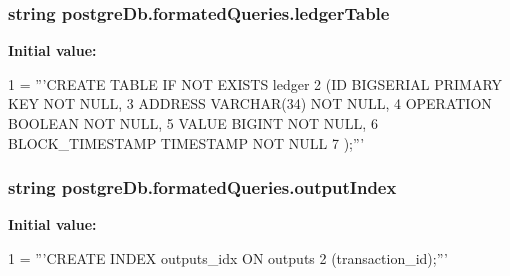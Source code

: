 \subsubsection[{ledger\+Table}]{\setlength{\rightskip}{0pt plus 5cm}string postgre\+Db.\+formated\+Queries.\+ledger\+Table}\label{namespacepostgreDb_1_1formatedQueries_a09445394a01258a235aa4db0ea66ea58}
{\bfseries Initial value\+:}
\begin{DoxyCode}
1 = \textcolor{stringliteral}{'''CREATE TABLE IF NOT EXISTS ledger}
2 \textcolor{stringliteral}{                (ID                 BIGSERIAL PRIMARY KEY   NOT NULL,}
3 \textcolor{stringliteral}{                ADDRESS             VARCHAR(34)         NOT NULL,}
4 \textcolor{stringliteral}{                OPERATION           BOOLEAN             NOT NULL,}
5 \textcolor{stringliteral}{                VALUE               BIGINT              NOT NULL,}
6 \textcolor{stringliteral}{                BLOCK\_TIMESTAMP     TIMESTAMP           NOT NULL}
7 \textcolor{stringliteral}{                );'''}
\end{DoxyCode}
\hypertarget{namespacepostgreDb_1_1formatedQueries_a099e801ee8670a18fece858b869e2292}{}
\subsubsection[{output\+Index}]{\setlength{\rightskip}{0pt plus 5cm}string postgre\+Db.\+formated\+Queries.\+output\+Index}\label{namespacepostgreDb_1_1formatedQueries_a099e801ee8670a18fece858b869e2292}
{\bfseries Initial value\+:}
\begin{DoxyCode}
1 = \textcolor{stringliteral}{'''CREATE INDEX outputs\_idx ON outputs}
2 \textcolor{stringliteral}{                    (transaction\_id);'''}
\end{DoxyCode}
\hypertarget{namespacepostgreDb_1_1formatedQueries_a0ac81b3d8d15f83d54d82e9f831e805c}{}
